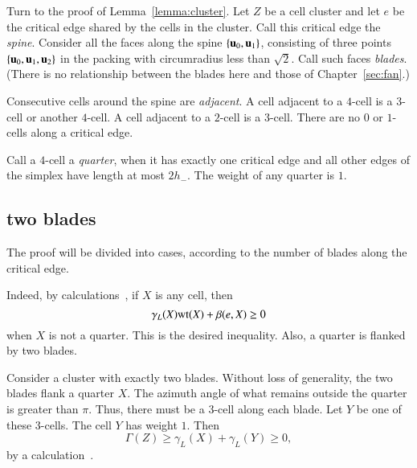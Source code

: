 Turn to the proof of Lemma~\ref{lemma:cluster}.   Let $Z$ be a cell cluster and let $e$ be the  critical edge shared by the cells in the cluster.   Call this critical edge the {\it spine}.  Consider all the faces along the spine $\{ {\mathbf u}_0, {\mathbf u}_1\}$, consisting of three points $\{ {\mathbf u}_0, {\mathbf u}_1, {\mathbf u}_2\}$ in the packing with circumradius less than $\sqrt2$.  Call such faces {\it blades}.  (There is no relationship between the blades here and those of Chapter~\ref{sec:fan}.)
%
%
%

Consecutive cells around the spine are {\it adjacent}.
A cell adjacent to a $4$-cell is a $3$-cell or another $4$-cell.  A cell adjacent to a $2$-cell is a $3$-cell.  There are no $0$ or $1$-cells along a critical edge.
%
%

Call a $4$-cell a {\it quarter}, when it has exactly one critical edge and all other edges of the simplex have length at most $2 h_-$.  The weight of any quarter is $1$.





\subsection{two blades}

The proof will be divided into cases, according to the number of blades along the critical edge.

 Indeed,
by calculations~\cite[GLFVCVK]{hales:2009:nonlinear}, if $X$ is any cell, then %
$$
 \gamma_L(X) {\operatorname{wt}}(X) + \beta(e,X)\ge 0
$$ 
when $X$ is not a quarter.  This is the desired inequality.  Also, a quarter is flanked by two blades.

Consider a cluster with exactly two blades.
Without loss of generality, the two blades flank a quarter
$X$. 
The azimuth angle of what remains outside the quarter
is greater than $\pi$.  Thus, there must be a $3$-cell
along each blade.  Let $Y$ be one of these $3$-cells.
The cell $Y$ has weight $1$.
Then 
\begin{equation}\label{eqn:34}
\Gamma(Z)\ge \gamma_L(X)+\gamma_L(Y)\ge 0,
\end{equation}
by a calculation~\cite[FHBVYXZ]{hales:2009:nonlinear}. %
%
%




